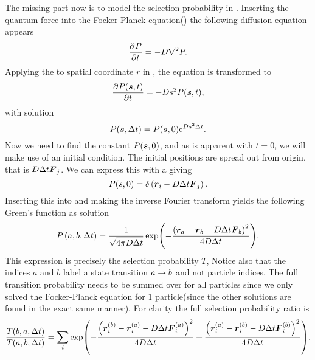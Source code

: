         The missing part now is to model the selection probability in
        . Inserting the quantum force into the
        Focker-Planck equation() the following
        diffusion equation appears
            \begin{equation}
                \prd{t}[P] = -D\nabla^2 P.
                \label{eq:diffeqFP}
            \end{equation}
        Applying the  to spatial coordinate $r$ in
        , the equation is transformed to
            \begin{equation}
                \prd{t}[P(\blds{s},t)] = -Ds^2 P(\blds{s},t),
            \end{equation}
        with solution
            \begin{equation}
                P(\boldsymbol{{s}},\Delta t) = P(\boldsymbol{{s}},0)\mathrm{e}^{Ds^2\Delta t}.
                \label{eq:Punfin}
            \end{equation}
        Now we need to find the constant $P(\boldsymbol{{s}},0)$, and as is apparent
        with $t=0$, we will make use of an initial condition. The initial
        positions are spread out from origin, that is $D\Delta t\boldsymbol{{F}}_j$. We
        can express this with a \cite{GriffQuan,
        boasMath} giving
            \begin{equation}
                P(s,0) = \delta\left(\boldsymbol{{r}}_i - D\Delta t\boldsymbol{{F}}_j\right).
            \end{equation}
        Inserting this into  and making the inverse Fourier
        transform yields the following Green's function as solution
            \begin{equation}
                P\left(a, b, \Delta t\right) = \frac{1}{\sqrt{4\pi D\Delta t}}
                \exp(-\frac{\left(\boldsymbol{{r}}_a - \boldsymbol{{r}}_b - D\Delta t
                \boldsymbol{{F}}_b\right)^2}{4D\Delta t}).
            \end{equation}
        This expression is precisely the selection probability $T$, Notice also
        that the indices $a$ and $b$ label a state transition $a\rightarrow b$ and not
        particle indices. The full transition probability needs to be summed
        over for all particles since we only solved the Focker-Planck equation
        for $1$ particle(since the other solutions are found in the exact same
        manner). For clarity the full selection probability ratio is
            \begin{equation}
                \frac{T(b,a,\Delta t)}{T(a,b,\Delta t)} = \sum_i
                \exp(-\frac{\left(\boldsymbol{{r}}^{(b)}_i - \boldsymbol{{r}}^{(a)}_i - D\Delta
                t \boldsymbol{{F}}^{(a)}_i\right)^2}{4D\Delta t}
                +\frac{\left(\boldsymbol{{r}}^{(a)}_i - \boldsymbol{{r}}^{(b)}_i - D\Delta t
                \boldsymbol{{F}}^{(b)}_i\right)^2}{4D\Delta t}).
            \end{equation}


